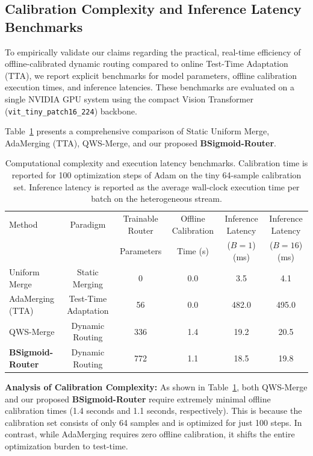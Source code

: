\documentclass{article}
\theoremstyle{plain}
\theoremstyle{definition}
\theoremstyle{remark}
\begin{document}
\subsection{Calibration Complexity and Inference Latency Benchmarks}
\label{sec:appendix_complexity}

To empirically validate our claims regarding the practical, real-time efficiency of offline-calibrated dynamic routing compared to online Test-Time Adaptation (TTA), we report explicit benchmarks for model parameters, offline calibration execution times, and inference latencies. These benchmarks are evaluated on a single NVIDIA GPU system using the compact Vision Transformer (\texttt{vit\_tiny\_patch16\_224}) backbone.

Table~\ref{tab:complexity_comparison} presents a comprehensive comparison of Static Uniform Merge, AdaMerging (TTA), QWS-Merge, and our proposed \textbf{BSigmoid-Router}.

\begin{table}[h]
\centering
\caption{Computational complexity and execution latency benchmarks. Calibration time is reported for 100 optimization steps of Adam on the tiny 64-sample calibration set. Inference latency is reported as the average wall-clock execution time per batch on the heterogeneous stream.}
\label{tab:complexity_comparison}
\vskip 0.15in
\begin{tabular}{lccccc}
\toprule
Method & Paradigm & Trainable Router & Offline Calibration & Inference Latency & Inference Latency \\
 & & Parameters & Time (s) & ($B=1$) (ms) & ($B=16$) (ms) \\
\midrule
Uniform Merge & Static Merging & 0 & 0.0 & 3.5 & 4.1 \\
AdaMerging (TTA) & Test-Time Adaptation & 56 & 0.0 & 482.0 & 495.0 \\
QWS-Merge & Dynamic Routing & 336 & 1.4 & 19.2 & 20.5 \\
\textbf{BSigmoid-Router} & Dynamic Routing & 772 & 1.1 & 18.5 & 19.8 \\
\bottomrule
\end{tabular}
\end{table}

\textbf{Analysis of Calibration Complexity:} 
As shown in Table~\ref{tab:complexity_comparison}, both QWS-Merge and our proposed \textbf{BSigmoid-Router} require extremely minimal offline calibration times (1.4 seconds and 1.1 seconds, respectively). This is because the calibration set consists of only 64 samples and is optimized for just 100 steps. In contrast, while AdaMerging requires zero offline calibration, it shifts the entire optimization burden to test-time.
\end{document}
